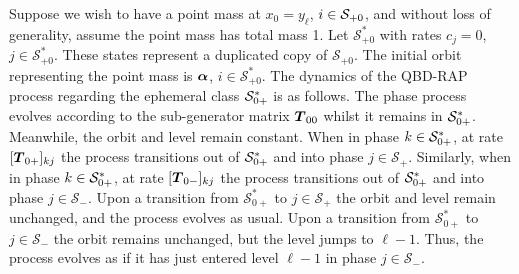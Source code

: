 \begin{rem}
Suppose we wish to have a point mass at \(x_0=y_{\ell}\), \(i\in\mathcal{S}_{+0}\), and without loss of generality, assume the point mass has total mass 1. Let \(\mathcal S_{+0}^*\) with rates \(c_j=0\), \(j\in\mathcal S_{+0}^*\). These states represent a duplicated copy of \(\mathcal S_{+0}\). The initial orbit representing the point mass is \(\boldsymbol \alpha\), \(i\in\mathcal S_{+0}^*\). The dynamics of the QBD-RAP process regarding the ephemeral class \(\mathcal{S}_{0+}^*\) is as follows. The phase process evolves according to the sub-generator matrix \(\boldsymbol T_{00}\) whilst it remains in \(\mathcal{S}_{0+}^*\). Meanwhile, the orbit and level remain constant. When in phase \(k\in\mathcal{S}_{0+}^*\), at rate \([\boldsymbol T_{0+}]_{kj}\) the process transitions out of \(\mathcal{S}_{0+}^*\) and into phase \(j\in\mathcal S_+\). Similarly, when in phase \(k\in\mathcal{S}_{0+}^*\), at rate \([\boldsymbol T_{0-}]_{kj}\) the process transitions out of \(\mathcal{S}_{0+}^*\) and into phase \(j\in\mathcal S_-\). Upon a transition from \(\mathcal S_{0+}^*\) to \(j\in\mathcal S_{+}\) the orbit and level remain unchanged, and the process evolves as usual. Upon a transition from \(\mathcal S_{0+}^*\) to \(j\in\mathcal S_{-}\) the orbit remains unchanged, but the level jumps to \(\ell - 1\). Thus, the process evolves as if it has just entered level \(\ell-1\) in phase \(j\in\mathcal S_-\). 
\end{rem}

